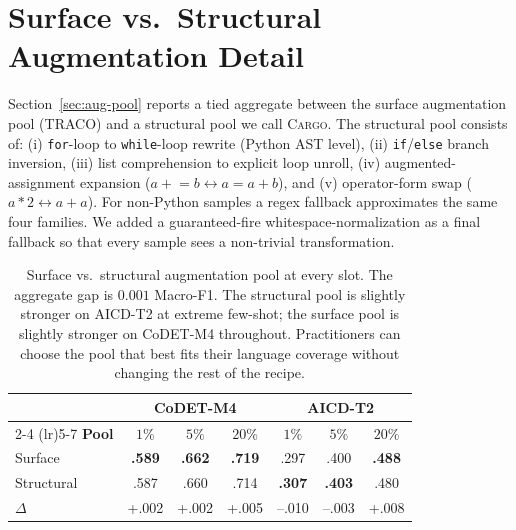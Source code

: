 ﻿\documentclass[11pt]{article}
\newcommand{\method}{\textsc{TRACO}\xspace}
\begin{document}
\section{Surface vs.\ Structural Augmentation Detail}
\label{app:aug-pool}

Section~\ref{sec:aug-pool} reports a tied aggregate between the
surface augmentation pool (\method) and a structural pool we call
\textsc{Cargo}. The structural pool consists of: (i)
\texttt{for}-loop to \texttt{while}-loop rewrite (Python AST level),
(ii) \texttt{if}/\texttt{else} branch inversion, (iii) list
comprehension to explicit loop unroll, (iv) augmented-assignment
expansion ($a\!+\!=\!b \leftrightarrow a\!=\!a\!+\!b$), and (v)
operator-form swap ($a\!*\!2 \leftrightarrow a\!+\!a$). For
non-Python samples a regex fallback approximates the same four
families. We added a guaranteed-fire whitespace-normalization as a
final fallback so that every sample sees a non-trivial
transformation.

\begin{table}[ht]
\centering\footnotesize
\setlength{\tabcolsep}{2pt}
\begin{tabular}{@{}l ccc ccc@{}}
\toprule
& \multicolumn{3}{c}{\textbf{CoDET-M4}} & \multicolumn{3}{c}{\textbf{AICD-T2}} \\
\cmidrule(lr){2-4} \cmidrule(lr){5-7}
\textbf{Pool} & $1\%$ & $5\%$ & $20\%$ & $1\%$ & $5\%$ & $20\%$ \\
\midrule
Surface          & \textbf{.589} & \textbf{.662} & \textbf{.719} & .297          & .400          & \textbf{.488} \\
Structural       & .587          & .660          & .714          & \textbf{.307} & \textbf{.403} & .480 \\
$\Delta$         & +.002         & +.002         & +.005         & --.010        & --.003        & +.008 \\
\bottomrule
\end{tabular}
\caption{\label{tab:augpool}
Surface vs.\ structural augmentation pool at every slot. The
aggregate gap is $0.001$ Macro-F1. The structural pool is slightly
stronger on AICD-T2 at extreme few-shot; the surface pool is
slightly stronger on CoDET-M4 throughout. Practitioners can choose
the pool that best fits their language coverage without changing
the rest of the recipe.}
\end{table}

\end{document}
